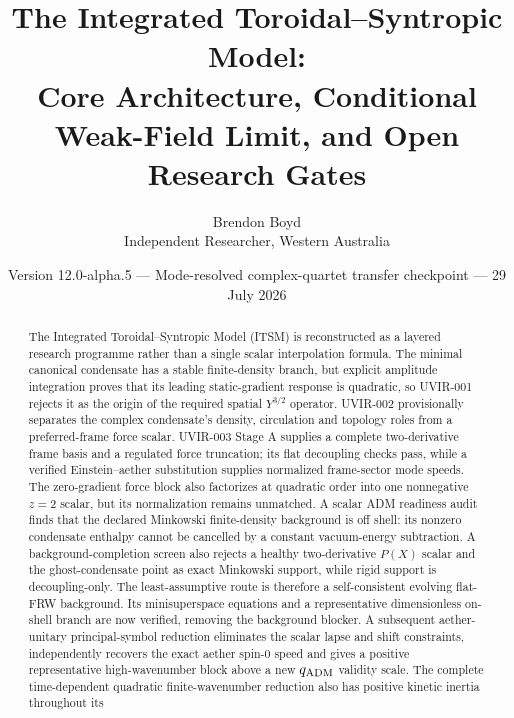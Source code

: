﻿\documentclass[11pt]{article}
\title{The Integrated Toroidal--Syntropic Model:\\
Core Architecture, Conditional Weak-Field Limit, and Open Research Gates}
\author{Brendon Boyd\\Independent Researcher, Western Australia}
\date{Version 12.0-alpha.5 --- Mode-resolved complex-quartet transfer checkpoint --- 29 July 2026}
\begin{document}
\maketitle

\begin{center}
\end{center}

\begin{abstract}
The Integrated Toroidal--Syntropic Model (ITSM) is reconstructed as a layered
research programme rather than a single scalar interpolation formula.  The
minimal canonical condensate has a stable finite-density branch, but explicit
amplitude integration proves that its leading static-gradient response is
quadratic, so UVIR-001 rejects it as the origin of the required spatial
$Y^{3/2}$ operator.  UVIR-002 provisionally separates the complex condensate's
density, circulation and topology roles from a preferred-frame force scalar.
UVIR-003 Stage A supplies a complete two-derivative frame basis and a regulated
force truncation; its flat decoupling checks pass, while a verified
Einstein--aether substitution supplies normalized frame-sector mode speeds.
The zero-gradient force block also factorizes at quadratic order into one
nonnegative $z=2$ scalar, but its normalization remains unmatched.  A scalar
ADM readiness audit finds that the declared Minkowski finite-density
background is off shell: its nonzero condensate enthalpy cannot be cancelled
by a constant vacuum-energy subtraction.  A background-completion screen also
rejects a healthy two-derivative $P(X)$ scalar and the ghost-condensate point
as exact Minkowski support, while rigid support is decoupling-only.  The
least-assumptive route is therefore a self-consistent evolving flat-FRW
background.  Its minisuperspace equations and a representative dimensionless
on-shell branch are now verified, removing the background blocker.  A
subsequent aether-unitary principal-symbol reduction eliminates the scalar
lapse and shift constraints, independently recovers the exact aether spin-0
speed and gives a positive representative high-wavenumber block above a new
$q_{\rm ADM}$ validity scale.  The complete time-dependent quadratic
finite-wavenumber reduction also has positive kinetic inertia throughout its

\end{abstract}
\end{document}
